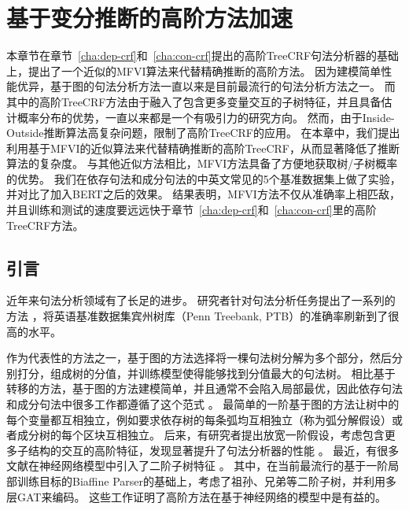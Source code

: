 \chapter{基于变分推断的高阶方法加速}
\label{cha:vi}

本章节在章节~\ref{cha:dep-crf}和~\ref{cha:con-crf}提出的高阶TreeCRF句法分析器的基础上，提出了一个近似的MFVI算法来代替精确推断的高阶方法。
因为建模简单性能优异，基于图的句法分析方法一直以来是目前最流行的句法分析方法之一。
而其中的高阶TreeCRF方法由于融入了包含更多变量交互的子树特征，并且具备估计概率分布的优势，一直以来都是一个有吸引力的研究方向。
然而，由于Inside-Outside推断算法高复杂问题，限制了高阶TreeCRF的应用。
在本章中，我们提出利用基于MFVI的近似算法来代替精确推断的高阶TreeCRF，从而显著降低了推断算法的复杂度。
与其他近似方法相比，MFVI方法具备了方便地获取树/子树概率的优势。
我们在依存句法和成分句法的中英文常见的5个基准数据集上做了实验，并对比了加入BERT之后的效果。
结果表明，MFVI方法不仅从准确率上相匹敌，并且训练和测试的速度要远远快于章节~\ref{cha:dep-crf}和~\ref{cha:con-crf}里的高阶TreeCRF方法。

\section{引言}\label{sec:vi-intro}
近年来句法分析领域有了长足的进步。
研究者针对句法分析任务提出了一系列的方法 \citep{dozat-etal-2017-biaffine,gomez-rodriguez-vilares-2018-constituent,ji-etal-2019-graph,zhang-etal-2020-fast,wei-etal-2020-span}，将英语基准数据集宾州树库（Penn Treebank, PTB）的准确率刷新到了很高的水平。

作为代表性的方法之一，基于图的方法选择将一棵句法树分解为多个部分，然后分别打分，组成树的分值，并训练模型使得能够找到分值最大的句法树。
相比基于转移的方法，基于图的方法建模简单，并且通常不会陷入局部最优，因此依存句法和成分句法中很多工作都遵循了这个范式 \citep{mcdonald-etal-2005-non,mcdonald-etal-2005-online,taskar-etal-2004-max}。
最简单的一阶基于图的方法让树中的每个变量都互相独立，例如要求依存树的每条弧均互相独立（称为弧分解假设）或者成分树的每个区块互相独立。
后来，有研究者提出放宽一阶假设，考虑包含更多子结构的交互的高阶特征，发现显著提升了句法分析器的性能 \citep{mcdonald-pereira-2006-online,koo-collins-2010-efficient,ma-zhao-2012-fourth}。
最近，有很多文献在神经网络模型中引入了二阶子树特征 \citep{chen-manning-2014-fast,ma-hovy-2017-neural,pei-etal-2015-effective}。
其中，\citet{ji-etal-2019-graph}在当前最流行的基于一阶局部训练目标的Biaffine Parser的基础上，考虑了祖孙、兄弟等二阶子树，并利用多层GAT来编码。
这些工作证明了高阶方法在基于神经网络的模型中是有益的。

